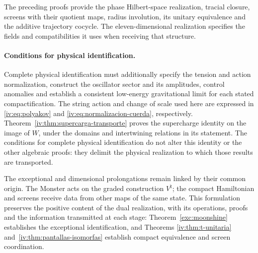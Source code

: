 The preceding proofs provide the phase Hilbert-space
realization, tracial closure, screens
with their quotient maps, radius involution,
its unitary equivalence and the additive trajectory
cocycle. The eleven-dimensional realization
specifies the fields and compatibilities it
uses when receiving that structure.

\paragraph{Conditions for physical identification.}
\label{iv:condiciones-realizacion-fisica}
Complete physical identification must additionally
specify the tension and action normalization,
construct the oscillator sector and its amplitudes,
control anomalies and establish a consistent
low-energy gravitational limit for each stated
compactification.
The string action and change of scale used here
are expressed in \eqref{iv:eq:polyakov}
and \eqref{iv:eq:normalizacion-cuerda}, respectively.
Theorem~\ref{iv:thm:supercarga-transporte}
proves the supercharge identity on the image of
\(W\), under the domains and intertwining relations
in its statement. The conditions for complete physical
identification do not alter this identity or the other
algebraic proofs: they delimit the physical realization
to which those results are transported.

The exceptional and dimensional prolongations
remain linked by their common origin. The
Monster acts on the graded construction
\(V^\natural\); the compact Hamiltonian and
screens receive data from other maps of the
same state. This formulation preserves the
positive content of the dual realization,
with its operations, proofs and the information
transmitted at each stage: Theorem~\ref{exc:moonshine}
establishes the exceptional identification, and Theorems
\ref{iv:thm:t-unitaria} and~\ref{iv:thm:pantallas-isomorfas}
establish compact equivalence and screen coordination.
